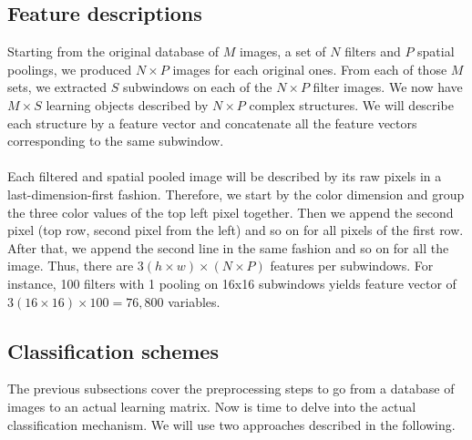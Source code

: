 \documentclass[a4paper]{report}
\begin{document}
		\subsection{Feature descriptions}		
		Starting from the original database of $M$ images, a set of $N$ filters and $P$ spatial poolings, we produced $N \times P$ images for each original ones. From each of those $M$ sets, we extracted $S$ subwindows on each of the $N \times P$ filter images. We now have $M \times S$ learning objects described by $N \times P$ complex structures. We will describe each structure by a feature vector and concatenate all the feature vectors corresponding to the same subwindow.
		\paragraph{}
		Each filtered and spatial pooled image will be described by its raw pixels in a last-dimension-first fashion. Therefore, we start by the color dimension and group the three color values of the top left pixel together. Then we append the second pixel (top row, second pixel from the left) and so on for all pixels of the first row. After that, we append the second line in the same fashion and so on for all the image.
		Thus, there are $3(h \times w) \times (N \times P)$ features per subwindows. For instance, 100 filters with 1 pooling on 16x16 subwindows yields feature vector of $3(16 \times 16) \times 100 = 76,800$ variables.
		
		
		\subsection{Classification schemes}
		The previous subsections cover the preprocessing steps to go from a database of images to an actual learning matrix. Now is time to delve into the actual classification mechanism. We will use two approaches described in the following. 
		
\end{document}

